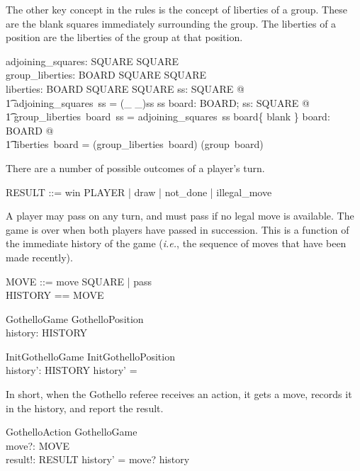 \documentclass{article}
\begin{document}
The other key concept in the rules is the concept of
liberties of a group.  These are the blank squares
immediately surrounding the group.  The liberties of
a position are the liberties of the group at that position.
\begin{axdef}
  adjoining\_squares: \power SQUARE \fun \power SQUARE \\
  group\_liberties: BOARD \fun \power SQUARE \fun \power SQUARE \\
  liberties: BOARD \fun SQUARE \fun \power SQUARE
\where
  \forall ss: \power SQUARE @ \\
  \t1 adjoining\_squares~ss =
      (\_ \adjoins \_)\limg ss \rimg \setminus ss
\also
  \forall board: BOARD; ss: \power SQUARE @ \\
  \t1 group\_liberties~board~ss =
      adjoining\_squares~ss \cap
      board\inv\limg \{ blank \} \rimg
\also
  \forall board: BOARD @ \\
  \t1 liberties~board = (group\_liberties~board) \circ (group~board)
\end{axdef}



There are a number of possible outcomes of a player's
turn.
\begin{zed}
  RESULT ::= win \ldata PLAYER \rdata | draw | not\_done | illegal\_move
\end{zed}

A player may pass on any turn, and must pass if
no legal move is available.  The game is over when
both players have passed in succession. This is
a function of the immediate history of the game
({\it i.e.\/}, the sequence of moves that have been made
recently).
\begin{zed}
  MOVE ::= move \ldata SQUARE \rdata | pass \\
  HISTORY == \seq MOVE
\end{zed}
\begin{schema}{GothelloGame}
  GothelloPosition \\
  history: HISTORY
\end{schema}
\begin{schema}{InitGothelloGame}
  InitGothelloPosition \\
  history': HISTORY
\where
  history' = \emptyset
\end{schema}

In short, when the Gothello referee receives an action, it
gets a move, records it in the history, and
report the result.
\begin{schema}{GothelloAction}
  \Delta GothelloGame \\
  move?: MOVE \\
  result!: RESULT
\where
  history' = \langle move? \rangle \cat history
\end{schema}
\end{document}
